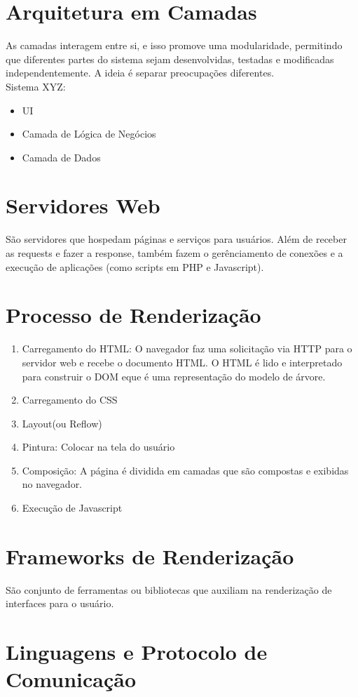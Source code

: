 \documentclass[ ]{article}
\begin{document}
	\section{Arquitetura em Camadas}
		As camadas interagem entre si, e isso promove uma modularidade, permitindo que diferentes partes do sistema sejam desenvolvidas, testadas e modificadas independentemente. A ideia é separar preocupações diferentes.\\
		Sistema XYZ:
		\begin{itemize}
			\item UI
			\item Camada de Lógica de Negócios
			\item Camada de Dados
		\end{itemize}
	\section{Servidores Web}
		São servidores que hospedam páginas e serviços para usuários. Além de receber as requests e fazer a response, também fazem o gerênciamento de conexões e a execução de aplicações (como scripts em PHP e Javascript).\\
	\section{Processo de Renderização}
		\begin{enumerate}
			\item Carregamento do HTML: O navegador faz uma solicitação via HTTP para o servidor web e recebe o documento HTML. O HTML é lido e interpretado para construir o DOM eque é uma representação do modelo de árvore.
			\item Carregamento do CSS
			\item Layout(ou Reflow)
			\item Pintura: Colocar na tela do usuário
			\item Composição: A página é dividida em camadas que são compostas e exibidas no navegador.
			\item Execução de Javascript
		\end{enumerate}
	\section{Frameworks de Renderização}
		São conjunto de ferramentas ou bibliotecas que auxiliam na renderização de interfaces para o usuário.
	\section{Linguagens e Protocolo de Comunicação}
\end{document}
